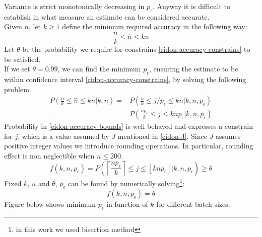 \documentclass[12pt,a4paper]{report}
\newcommand{\pc}{p_{\epsilon}}
\begin{document}
Variance is strict monotonically decreasing in $\pc$.
Anyway it is difficult to establish in what measure an estimate can be considered accurate.\\
Given $n$, let $k \geq1$ define the minimum required accuracy in the following way: 
\begin{equation}
\frac{n}{k}\leq\hat{n}\leq kn
\label{cidon-accuracy-constrains}
\end{equation}
Let $\theta$ be the probability we require for constrains \eqref{cidon-accuracy-constrains} to be satisfied.\\
If we set $\theta=0.99$, we can find the minimum $\pc$, ensuring the estimate to be within confidence interval \eqref{cidon-accuracy-constrains}, by solving the following problem.\\
\begin{equation}
\begin{split}
P\left(\frac{n}{k}\leq \hat{n} \leq kn \big| k,n\right)=& P\left(\frac{n}{k}\leq j/\pc \leq kn \big| k,n,\pc\right)\\
=&P\left(\frac{n\pc}{k}\leq j \leq kn\pc \big| k,n,\pc\right)
\end{split}
\label{cidon-accuracy-bounds}
\end{equation}
Probability in \eqref{cidon-accuracy-bounds} is well behaved and expresses a constrain for $j$, which is a value assumed by $J$ mentioned in \eqref{cidon-J}. Since $J$ assumes positive integer values we introduce rounding operations. In particular, rounding effect is non neglectible when $n\leq 200$.  \\
\begin{equation}
f(k,n,\pc) = P\left(\left\lceil \frac{n\pc}{k}\right\rceil\leq j \leq \left\lfloor kn\pc\right\rfloor \big| k,n,\pc\right)\geq \theta
\end{equation}
Fixed $k$, $n$ and $\theta$, $\pc$ can be found by numerically solving\footnote{in this work we used bisection method}:
\begin{equation}
f(k,n,\pc) = \theta
\end{equation}
Figure below shows minimum $\pc$ in function of $k$ for different batch sizes.\\
\end{document}
